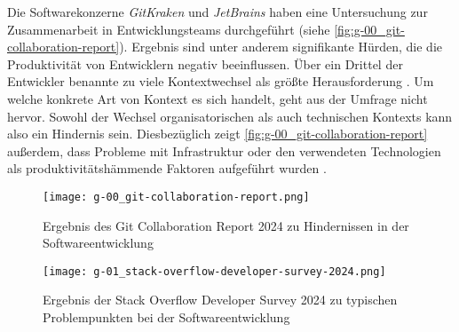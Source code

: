 Die Softwarekonzerne \textit{GitKraken} und \textit{JetBrains} haben eine Untersuchung zur Zusammenarbeit in Entwicklungsteams durchgeführt (siehe \autoref{fig:g-00_git-collaboration-report}). Ergebnis sind unter anderem signifikante Hürden, die die Produktivität von Entwicklern negativ beeinflussen. Über ein Drittel der Entwickler benannte zu viele Kontextwechsel als größte Herausforderung \cite{213:2024-State-of-Git-Collaboration}. Um welche konkrete Art von Kontext es sich handelt, geht aus der Umfrage nicht hervor. Sowohl der Wechsel organisatorischen als auch technischen Kontexts kann also ein Hindernis sein. Diesbezüglich zeigt \autoref{fig:g-00_git-collaboration-report} außerdem, dass Probleme mit Infrastruktur oder den verwendeten Technologien als produktivitätshämmende Faktoren aufgeführt wurden \cite{213:2024-State-of-Git-Collaboration}.

\pagebreak[4]

\begin{figure}[h]
    \centering
    \begin{minipage}[b]{0.39\textwidth}
        \centering
        \texttt{[image: g-00\_git-collaboration-report.png]}
        \caption{Ergebnis des Git Collaboration Report 2024 zu Hindernissen in der Softwareentwicklung \cite{213:2024-State-of-Git-Collaboration}}
        \label{fig:g-00_git-collaboration-report}
    \end{minipage}
    \hfill
    \begin{minipage}[b]{0.59\textwidth}
        \centering
        \texttt{[image: g-01\_stack-overflow-developer-survey-2024.png]}
        \caption{Ergebnis der Stack Overflow Developer Survey 2024 zu typischen Problempunkten bei der Softwareentwicklung \cite{212:Developer-Survey}}
        \label{fig:g-01_stack-overflow-developer-survey-2024}
    \end{minipage}
\end{figure}

